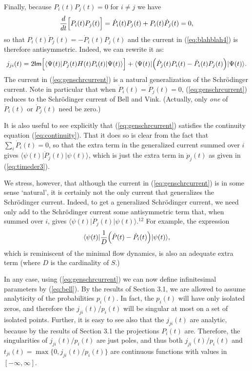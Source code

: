 \documentclass[12pt]{article}
\newcommand{\be}{\vspace*{6pt} \begin{equation}}
\newcommand{\ee}{\vspace*{10pt} \end{equation}}
\renewcommand{\Im}{\mbox{{\sf Im}}}                             %
\newcommand{\bra}[1]{\langle #1\vert}                           %
\newcommand{\ket}[1]{\vert #1\rangle}                           %
\begin{document}
Finally, because $P_i(t)P_j(t) = 0$ for $i \neq j$ we have
\be
  \frac{d}{dt} \Big[ P_i(t)P_j(t) \Big]
   = \dot{P}_i(t)P_j(t) + P_i(t)\dot{P}_j(t) = 0,
\ee
so that $P_i(t)\dot{P}_j(t) = - \dot{P}_i(t)P_j(t)$ and the current
in (\ref{eq:blahblah4}) is therefore antisymmetric.  Indeed, we can
rewrite it as:
\be
  \label{eq:genschrcurrent}
  j_{ji}(t) = 2 \Im \Big[ \bra{\Psi(t)} P_j(t) H(t) P_i(t) 
  \ket{\Psi(t)} \Big] + \bra{\Psi(t)}\Big( \dot{P}_j(t)P_i(t) - 
  \dot{P}_i(t)P_j(t) \Big) \ket{\Psi(t)}.
\ee
The current in (\ref{eq:genschrcurrent}) is a natural generalization
of the Schr\"odinger current.  Note in particular that when
$\dot{P}_i(t) = \dot{P}_j(t) = 0$, (\ref{eq:genschrcurrent}) reduces
to the Schr\"odinger current of Bell and Vink.  (Actually, only {\it
one} of $\dot{P}_{i}(t)$ or $\dot{P}_{j}(t)$ need be zero.)

It is also useful to see explicitly that (\ref{eq:genschrcurrent}) 
satisfies the continuity equation (\ref{eq:continuity}).  That it does 
so is clear from the fact that $\sum_i \dot{P}_i(t) = 0$, so that the 
extra term in the generalized current summed over $i$ gives 
$\bra{\psi(t)}\dot{P}_j(t)\ket{\psi(t)}$, which is just the extra term 
in $\dot{p}_j(t)$ as given in (\ref{eq:timeder3}).

We stress, however, that although the current in 
(\ref{eq:genschrcurrent}) is in some sense `natural', it is certainly 
not the only current that generalizes the Schr\"odinger current.  
Indeed, to get a generalized Schr\"odinger current, we need only add 
to the Schr\"odinger current some antisymmetric term that, when summed 
over $i$, gives $\bra{\psi(t)}\dot{P}_j(t)\ket{\psi(t)}$.$^{12}$ For 
example, the expression
\be
  \bra{\psi(t)}\frac{1}{D} \Big( \dot{P}(t) - \dot{P}_i(t) 
  \Big)\ket{\psi(t)},
\ee
which is reminiscent of the minimal flow dynamics, is also an adequate
extra term (where $D$ is the cardinality of $S$.)

In any case, using (\ref{eq:genschrcurrent}) we can now define 
infinitesimal parameters by (\ref{eq:bell}).  By the results of 
Section 3.1, we are allowed to assume analyticity of the probabilities 
$p_i(t)$.  In fact, the $p_i(t)$ will have only isolated zeros, and 
therefore the $j_{ji}(t)/p_i(t)$ will be singular at most on a set of 
isolated points.  Further, it is easy to see also that the $j_{ji}(t)$ 
are analytic, because by the results of Section 3.1 the projections 
$P_i(t)$ are.  Therefore, the singularities of $j_{ji}(t)/p_i(t)$ are 
just poles, and thus both $j_{ji}(t)/p_i(t)$ and 
$t_{ji}(t)=\max\{0,j_{ji}(t)/p_i(t)\}$ are continuous functions with 
values in $[-\infty,\infty]$.
\end{document}
